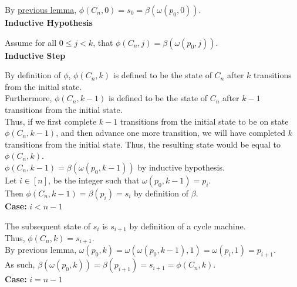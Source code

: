 \documentclass[a4paper,12pt]{article}
\begin{document}
\noindent By \hyperlink{lemma:phi_of_0}{previous lemma}, $\phi(C_n, 0) = s_0 = \beta(\omega(p_0, 0))$.\\


\noindent
\textbf{Inductive Hypothesis}

\noindent Assume for all $0 \leq j < k$, that $\phi(C_n, j) = \beta(\omega(p_0, j))$.\\


\noindent
\textbf{Inductive Step}

\noindent By definition of $\phi$, $\phi(C_n, k)$ is defined to be the state of $C_n$ after $k$ transitions from the initial state.\\

\noindent Furthermore, $\phi(C_n, k - 1)$ is defined to be the state of $C_n$ after $k - 1$ transitions from the initial state.\\

\noindent Thus, if we first complete $k - 1$ transitions from the initial state to be on state $\phi(C_n, k - 1)$, and then advance one more transition, we will have completed $k$ transitions from the initial state. Thus, the resulting state would be equal to $\phi(C_n, k)$.\\

\noindent $\phi(C_n, k - 1) = \beta(\omega(p_0, k - 1))$ by inductive hypothesis.\\

\noindent Let $i \in [n]$, be the integer such that $\omega(p_0, k - 1) = p_i$.\\

\noindent Then $\phi(C_n, k - 1) = \beta(p_i) = s_i$ by definition of $\beta$.\\


\noindent
\textbf{Case:} $i < n - 1$

\noindent The subsequent state of $s_i$ is $s_{i+1}$ by definition of a cycle machine.\\

\noindent Thus, $\phi(C_n, k) = s_{i+1}$.\\

\noindent By previous lemma, $\omega(p_0, k) = \omega(\omega(p_0, k - 1), 1) = \omega(p_i, 1) = p_{i+1}$.\\

\noindent As such, $\beta(\omega(p_0, k)) = \beta(p_{i+1}) = s_{i + 1} = \phi(C_n, k)$.\\


\noindent
\textbf{Case:} $i = n - 1$
\end{document}

